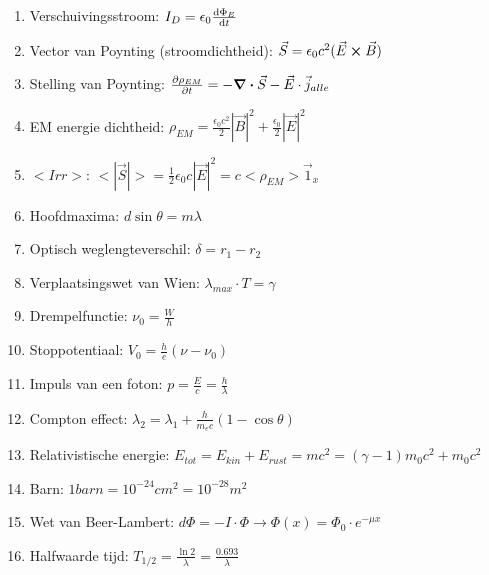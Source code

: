 \documentclass[12pt]{article}
\begin{document}
\begin{enumerate}
	    \item Verschuivingsstroom: $ I_D = \epsilon_0 \dv{\Phi_E}{t} $
	    \item Vector van Poynting (stroomdichtheid): $ \vec{S} = \epsilon_0 c^2 (\vec{E}\cross\vec{B})$
	    \item Stelling van Poynting: $ \pdv{\rho_{EM}}{t} = -\div \vec{S} - \vec{E} \cdot \vec{j}_{alle} $
	    \item EM energie dichtheid: $ \rho_{EM} = \frac{\epsilon_0 c^2}{2}|\vec{B}|^2 + \frac{\epsilon_0}{2}|\vec{E}|^2 $
	    \item $<Irr>$: $ <|\vec{S}|> = \frac{1}{2} \epsilon_0 c |\vec{E}|^2 = c <\rho_{EM}> \vec{1}_x $
	    \item Hoofdmaxima: $ d \sin\theta = m\lambda $
	    \item Optisch weglengteverschil: $ \delta = r_1 - r_2 $
	    \item Verplaatsingswet van Wien: $ \lambda_{max} \cdot T = \gamma $
	    \item Drempelfunctie:  $ \nu_0 = \frac{W}{h} $
	    \item Stoppotentiaal: $ V_0 = \frac{h}{e} (\nu - \nu_0) $
	    \item Impuls van een foton: $ p = \frac{E}{c} = \frac{h}{\lambda} $
	    \item Compton effect: $ \lambda_2 = \lambda_1 + \frac{h}{m_e c} (1-\cos\theta) $
	    \item Relativistische energie: $ E_{tot} = E_{kin} + E_{rust} = mc^2 = (\gamma-1)m_0c^2 + m_0c^2 $
	    \item Barn: $ 1 barn = 10^{-24}cm^2 = 10^{-28}m^2 $
	    \item Wet van Beer-Lambert:  $ d\Phi = -I \cdot \Phi \to \Phi(x) = \Phi_0 \cdot e^{-\mu x} $
	    \item Halfwaarde tijd: $ T_{1/2} = \frac{\ln 2}{\lambda} = \frac{0.693}{\lambda} $
    \end{enumerate}
\end{document}
